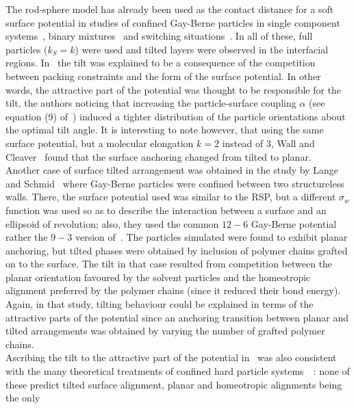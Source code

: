 The rod-sphere model has already been used as the contact distance for a soft surface potential in 
studies of confined Gay-Berne particles in single component systems~\cite{ZhangChakrabarti96, 
WallCleaver97,TeixeiraChrzanowska01},  binary mixtures~\cite{LathamCleaver00} 
and switching situations~\cite{rwThesis}.  In all of these, full particles (\ie $k_S = k$) 
were used and tilted layers were observed in the interfacial regions.
In~\cite{WallCleaver97,TeixeiraChrzanowska01} the tilt was explained to be a consequence of 
the competition 
between packing constraints and the form of the surface potential. In other words, the attractive 
part of the potential was thought to be responsible for the tilt, the authors noticing that increasing 
the  particle-surface coupling $\alpha$ (see equation (9) of~\cite{WallCleaver97}) induced a tighter 
distribution of the particle orientations about the optimal tilt angle. It is interesting to
note however, that using the same surface potential, but a molecular elongation $k=2$ instead of
$3$, Wall and Cleaver~\cite{WallCleaver03} found that the surface anchoring changed from tilted
to planar.\\
Another case of surface tilted arrangement was obtained in the study by Lange and 
Schmid~\cite{LangeSchmid02,LangeSchmid02a,LangeSchmid02c} where 
Gay-Berne particles were confined between two structureless walls. There, the surface potential 
used was
similar to the RSP, but a different $\sigma_w$ function was used so as to describe the
interaction between a surface and an ellipsoid of revolution; also, they used the common $12-6$
Gay-Berne potential rather the $9-3$ version of~\cite{WallCleaver97}. The particles simulated were found
to exhibit planar anchoring, but tilted phases were obtained by inclusion of polymer chains
grafted on to the surface. The tilt in that case resulted from competition between the planar
orientation favoured by the solvent particles and the homeotropic alignment preferred by the 
polymer chains (since it reduced their bond energy). Again, in that study, tilting behaviour could 
be explained in terms
of the attractive parts of the potential since an anchoring transition between planar and tilted
arrangements was obtained by varying the number of grafted polymer chains.\\
Ascribing the tilt to the attractive part of the potential in~\cite{WallCleaver97} was also 
consistent with the many theoretical treatments of confined hard particle 
systems~\cite{HolystPoniewierski88,Chrzanowska_Teixera_01}~: 
none of these predict tilted surface alignment, planar and homeotropic alignments being the only
